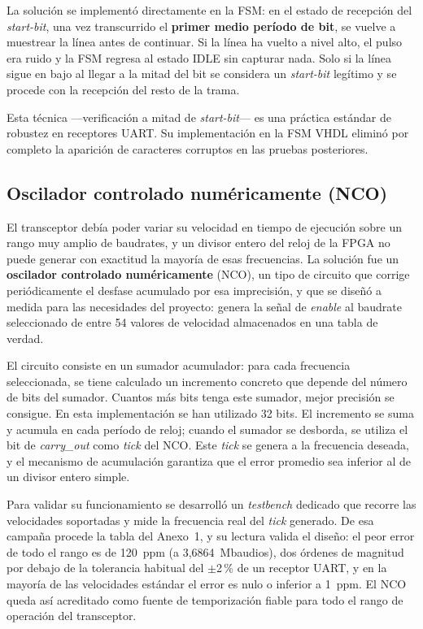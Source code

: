 La solución se implementó directamente en la FSM: en el estado de recepción del
\textit{start-bit}, una vez transcurrido el \textbf{primer medio período de bit}, se vuelve a muestrear la
línea antes de continuar. Si la línea ha vuelto a nivel alto, el pulso era ruido y la FSM regresa
al estado IDLE sin capturar nada. Solo si la línea sigue en bajo al llegar a la mitad del bit se
considera un \textit{start-bit} legítimo y se procede con la recepción del resto de la trama.

Esta técnica ---verificación a mitad de \textit{start-bit}--- es una práctica estándar de robustez en
receptores UART. Su implementación en la FSM VHDL eliminó por completo la aparición de
caracteres corruptos en las pruebas posteriores.

\subsection{Oscilador controlado numéricamente (NCO)}

El transceptor debía poder variar su velocidad en tiempo de ejecución sobre un rango muy amplio
de baudrates, y un divisor entero del reloj de la FPGA no puede generar con exactitud la mayoría
de esas frecuencias. La solución fue un \textbf{oscilador controlado numéricamente} (NCO), un tipo
de circuito que corrige periódicamente el desfase acumulado por esa imprecisión, y que se diseñó
a medida para las necesidades del proyecto: genera la señal de \textit{enable} al baudrate
seleccionado de entre 54 valores de velocidad almacenados en una tabla de verdad.

El circuito consiste en un sumador acumulador: para cada frecuencia seleccionada, se tiene
calculado un incremento concreto que depende del número de bits del sumador. Cuantos más
bits tenga este sumador, mejor precisión se consigue. En esta implementación se han
utilizado 32 bits. El incremento se suma y acumula en cada período de reloj; cuando el
sumador se desborda, se utiliza el bit de \textit{carry\_out} como \textit{tick} del NCO. Este \textit{tick} se genera
a la frecuencia deseada, y el mecanismo de acumulación garantiza que el error promedio sea
inferior al de un divisor entero simple.

Para validar su funcionamiento se desarrolló un \textit{testbench} dedicado que recorre las
velocidades soportadas y mide la frecuencia real del \textit{tick} generado. De esa campaña
procede la tabla del Anexo~1, y su lectura valida el diseño: el peor error de todo el rango es de
120~ppm (a 3,6864~Mbaudios), dos órdenes de magnitud por debajo de la tolerancia habitual del
$\pm$2\,\% de un receptor UART, y en la mayoría de las velocidades estándar el error es nulo o
inferior a 1~ppm. El NCO queda así acreditado como fuente de temporización fiable para todo el
rango de operación del transceptor.

